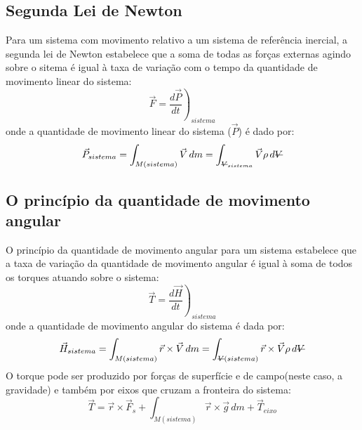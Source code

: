 \documentclass{article}
\newcommand{\stkout}[1]{\ifmmode\text{\sout{\ensuremath{#1}}}\else\sout{#1}\fi}
\begin{document}
\subsection{Segunda Lei de Newton}
Para um sistema com movimento relativo a um sistema de referência inercial, a segunda lei de Newton estabelece que a soma de todas as forças externas agindo sobre o sitema é igual à taxa de variação com o tempo da quantidade de movimento linear do sistema:
\begin{equation}
  \vec{F}=\left.\frac{d\vec{P}}{dt}\right)_{sistema}
  \label{eq:segundaLeiNewton}
\end{equation}
onde a quantidade de movimento linear do sistema ($\vec{P}$) é dado por:
\begin{equation}
  \vec{P}_{sistema}=\int_{M(sistema)}^{ } \vec{V}\, dm = \int_{\stkout{V}_{sistema}}^{ } \vec{V} \rho\, d\stkout{V} 
  \label{eq:movimentoLinearFormula}
\end{equation}
\subsection{O princípio da quantidade de movimento angular}
O princípio da quantidade de movimento angular para um sistema estabelece que a taxa de variação da quantidade de movimento angular é igual à soma de todos os torques atuando sobre o sistema:
\begin{equation}
  \vec{T}=\left.\frac{d\vec{H}}{dt}\right)_{sistema}
  \label{eq:TorqueIgualVariacaoMovimentoAngular}
\end{equation}
onde a quantidade de movimento angular do sistema é dada por:
\begin{equation}
  \vec{H}_{sistema}=\int_{M(sistema)}^{ } \vec{r} \times \vec{V}\, dm = \int_{\stkout{V}(sistema)}^{ } \vec{r} \times \vec{V} \rho \, d\stkout{V}
  \label{eq:qntMovimentoAngular}
\end{equation}
O torque pode ser produzido por forças de superfície e de campo(neste caso, a gravidade) e também por eixos que cruzam a fronteira do sistema:
\begin{equation}
  \vec{T}=\vec{r} \times \vec{F}_s + \int_{M(sistema)}^{ } \vec{r} \times \vec{g}\, dm + \vec{T}_{eixo} 
  \label{eq:torque}
\end{equation}
\end{document}
